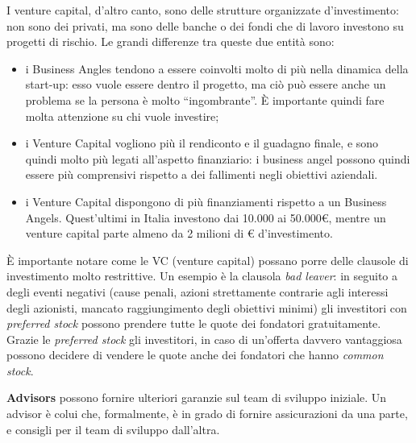 I venture capital, d'altro canto, sono delle strutture organizzate
d'investimento: non sono dei privati, ma sono delle banche o dei fondi che di
lavoro investono su progetti di rischio. Le grandi differenze tra queste due
entità sono:
\begin{itemize}
 \item i Business Angles tendono a essere coinvolti molto di più nella dinamica
 della start-up: esso vuole essere dentro il progetto, ma ciò può essere anche
 un problema se la persona è molto ``ingombrante''. È importante quindi fare
 molta attenzione su chi vuole investire;
 \item i Venture Capital vogliono più il rendiconto e il guadagno finale, e
 sono quindi molto più legati all'aspetto finanziario: i business angel possono
 quindi essere più comprensivi rispetto a dei fallimenti negli obiettivi
 aziendali.
 \item i Venture Capital dispongono di più finanziamenti rispetto a un
 Business Angels. Quest'ultimi in Italia investono dai 10.000 ai
 50.000\euro{}, mentre un venture capital parte almeno da 2 milioni di \euro{}
 d'investimento.
\end{itemize}

È importante notare come le VC (venture capital) possano porre delle clausole
di investimento molto restrittive. Un esempio è la clausola
\textit{bad leaver}: in seguito a degli eventi negativi (cause penali, azioni
strettamente contrarie agli interessi degli azionisti, mancato raggiungimento
degli obiettivi minimi) gli investitori con \textit{preferred stock} possono
prendere tutte le quote dei fondatori gratuitamente. Grazie le
\textit{preferred stock} gli investitori, in caso di un'offerta davvero
vantaggiosa possono decidere di vendere le quote anche dei fondatori che
hanno \textit{common stock}.

\textbf{Advisors} possono fornire ulteriori garanzie sul team di sviluppo
iniziale. Un advisor è colui che, formalmente, è in grado di fornire
assicurazioni da una parte, e consigli per il team di sviluppo dall'altra.
